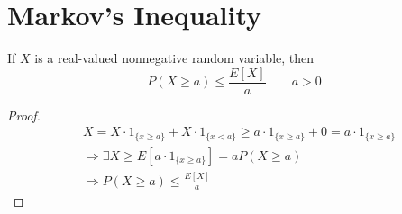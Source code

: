 \section{Markov's Inequality}
\begin{theorem}
    If $X$ is a real-valued nonnegative random variable, then
    \[ P(X \geq a) \leq \frac{E[X]}{a} \qquad a > 0                          \]
\end{theorem}
\begin{proof}
\begin{align*}
   &X = X \cdot 1_{\lbrace x \geq a \rbrace} + X \cdot 1_{\lbrace x < a\rbrace}
      \geq a \cdot 1_{\lbrace x \geq a \rbrace} + 0
      = a \cdot 1_{\lbrace x \geq a \rbrace}                                 \\
   &\Rightarrow \exists X \geq E[a \cdot 1_{\lbrace x \geq a \rbrace}]
                          = a P(X \geq a)                                    \\
   &\Rightarrow P(X \geq a) \leq \frac{E[X]}{a}
\end{align*}
\end{proof}